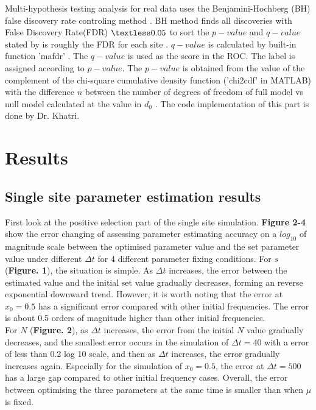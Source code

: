 \documentclass[12pt]{article}
\begin{document}
Multi-hypothesis testing analysis for real data uses the Benjamini-Hochberg (BH) false discovery rate controling method \citep{benjamini1995controlling}. BH method finds all discoveries with False Discovery Rate(FDR) $\textless 0.05$ to sort the $p-value$ and  $q-value$ stated by \cite{storey2002direct} is roughly the FDR for each site . $q-value$ is calculated by built-in function 'mafdr' \citep{storey2004strong, storey2003positive,  storey2003statistical}. The $q-value$ is used as the score in the ROC. The label is assigned according to $p-value$. The $p-value$ is obtained from the value of the complement of the chi-square cumulative density function ('chi2cdf' in MATLAB) with the difference $n$ between the number of degrees of freedom of full model vs null model  calculated at the value in $d_0$ \citep{abramowitz1968handbook}. The code implementation of this part is done by Dr. Khatri.


\newpage
\section{Results}
\subsection{Single site parameter estimation results}
First look at the positive selection part of the single site simulation. \textbf{Figure 2-4} show the error changing of assessing parameter estimating accuracy on a $log_{10}$ of magnitude scale between the optimised parameter value and the set parameter value under different $\Delta t$ for 4 different parameter fixing conditions. For $s$ (\textbf{Figure. 1}), the situation is simple. As $\Delta t$ increases, the error between the estimated value and the initial set value gradually decreases, forming an reverse exponential downward trend. However, it is worth noting that the error at $x_0=0.5$ has a significant error compared with other initial frequencies. The error is about 0.5 orders of magnitude higher than other initial frequencies.\\

For $N$ (\textbf{Figure. 2}), as $\Delta t$ increases, the error from the initial $N$ value gradually decreases, and the smallest error occurs in the simulation of $\Delta t=40$ with a error of less than 0.2 log 10 scale, and then as $\Delta t $ increases, the error gradually increases again. Especially for the simulation of $x_0=0.5$, the error at $\Delta t=500$ has a large gap compared to other initial frequency cases. Overall, the error between optimising the three parameters at the same time is smaller than when $\mu$ is fixed.\\
\end{document}
